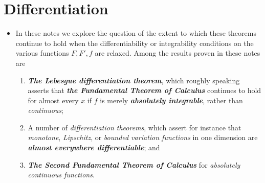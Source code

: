 \documentclass[11pt]{article}
\begin{document}
\section{Differentiation}
\begin{itemize}
\item \begin{remark}
In these notes we explore the question of the extent to which these theorems continue to hold when the differentiability or integrability
conditions on the various functions $F, F', f$ are relaxed. Among the results proven in these notes are
\begin{enumerate}
\item \emph{\textbf{The Lebesgue differentiation theorem}}, which roughly speaking asserts that \emph{\textbf{the Fundamental Theorem of Calculus}} continues to hold for almost every $x$ if $f$ is merely \emph{\textbf{absolutely integrable}}, rather than \emph{continuous};
\item A number of \emph{differentiation theorems}, which assert for instance that \emph{monotone}, \emph{Lipschitz}, or \emph{bounded variation functions} in one dimension are \emph{\textbf{almost everywhere differentiable}}; and
\item \emph{\textbf{The Second Fundamental Theorem of Calculus}} for \emph{absolutely continuous functions}.
\end{enumerate}
\end{remark}
\end{itemize}
\end{document}
